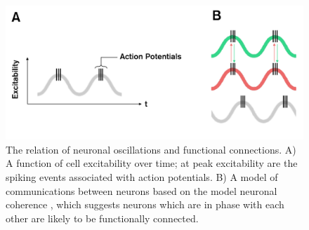 \begin{figure}
	\includegraphics[width=\linewidth]{./images/chapter1/Figure_osc.png}\caption{The relation of neuronal oscillations and functional connections. A) A function of cell excitability over time; at peak excitability are the spiking events associated with action potentials. B) A model of communications between neurons based on the model neuronal coherence \citep{Fries2005}, which suggests neurons which are in phase with each other are likely to be functionally connected.}\label{figure_1_osc}
\end{figure}

